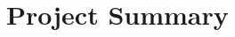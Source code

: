 \documentclass[12pt, fullpage,letterpaper]{article}
\begin{document}
	\section*{\normalfont Project Summary}  
%		
%		
%		
%		
%		
\end{document}
